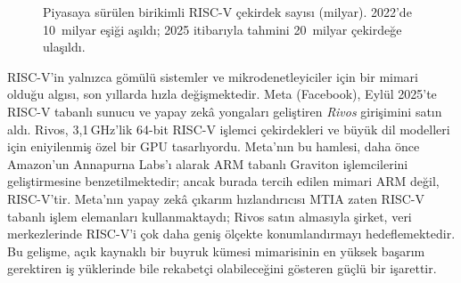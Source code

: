 \begin{figure}[H]
\centering
{}
\caption[RISC-V çekirdek sayısının yıllara göre büyümesi]{Piyasaya sürülen birikimli RISC-V çekirdek sayısı (milyar). 2022'de 10~milyar eşiği aşıldı; 2025 itibarıyla tahmini 20~milyar çekirdeğe ulaşıldı.}
\label{fig:riscv-buyume}
\end{figure}

\begin{bilginot}
RISC-V'in yalnızca gömülü sistemler ve mikrodenetleyiciler için bir mimari olduğu algısı, son yıllarda hızla değişmektedir. Meta (Facebook), Eylül 2025'te RISC-V tabanlı sunucu ve yapay zekâ yongaları geliştiren \emph{Rivos} girişimini satın aldı. Rivos, 3{,}1\,GHz'lik 64-bit RISC-V işlemci çekirdekleri ve büyük dil modelleri için eniyilenmiş özel bir GPU tasarlıyordu. Meta'nın bu hamlesi, daha önce Amazon'un Annapurna Labs'ı alarak ARM tabanlı Graviton işlemcilerini geliştirmesine benzetilmektedir; ancak burada tercih edilen mimari ARM değil, RISC-V'tir. Meta'nın yapay zekâ çıkarım hızlandırıcısı MTIA zaten RISC-V tabanlı işlem elemanları kullanmaktaydı; Rivos satın almasıyla şirket, veri merkezlerinde RISC-V'i çok daha geniş ölçekte konumlandırmayı hedeflemektedir. Bu gelişme, açık kaynaklı bir buyruk kümesi mimarisinin en yüksek başarım gerektiren iş yüklerinde bile rekabetçi olabileceğini gösteren güçlü bir işarettir.
\end{bilginot}

